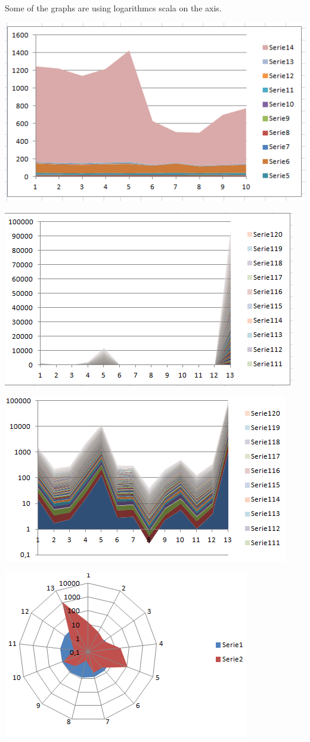 \documentclass[a4paper,12pt,pdftex]{article}
\begin{document}
Some of the graphs are using logarithmcs scala on the axis. 

\includegraphics{stackplot.png}

\includegraphics{stackplot2.png}

\includegraphics{stackplot3.png}

\includegraphics{radarplot.png}
\end{document}

